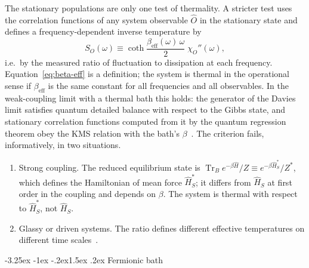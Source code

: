 \documentclass[10pt,a4paper]{article}
\makeatletter
\renewcommand{\subsection}{\@startsection{subsection}{2}{\z@}%
  {-3.25ex \@plus -1ex \@minus -.2ex}{1.5ex \@plus .2ex}%
  {\normalfont\fontsize{15.5pt}{19pt}\selectfont\bfseries}}
\newcommand{\Tr}{\operatorname{Tr}}
\makeatother
\begin{document}
The stationary populations are only one test of thermality.
A stricter test uses the correlation functions of any system observable $ \hat O $ in the stationary state and defines a frequency-dependent inverse temperature by
\begin{equation}
  S_O(\omega) \equiv \coth\frac{\beta_{\mathrm{eff}}(\omega)\,\omega}{2} \; \chi_O''(\omega) ,
  \label{eq:beta-eff}
\end{equation}
i.e.\ by the measured ratio of fluctuation to dissipation at each frequency.
Equation~\eqref{eq:beta-eff} is a definition; the system is thermal in the operational sense if $ \beta_{\mathrm{eff}} $ is the same constant for all frequencies and all observables.
In the weak-coupling limit with a thermal bath this holds: the generator of the Davies limit satisfies quantum detailed balance with respect to the Gibbs state, and stationary correlation functions computed from it by the quantum regression theorem obey the KMS relation with the bath's $ \beta $~\cite{Davies1974,Breuer2002}.
The criterion fails, informatively, in two situations.
\begin{enumerate}[label=(\roman*), leftmargin=2.2em]
\item Strong coupling. The reduced equilibrium state is $ \Tr_B e^{-\beta\hat H}/Z \equiv e^{-\beta \hat H_S^*}/Z^* $, which defines the Hamiltonian of mean force $ \hat H_S^* $; it differs from $ \hat H_S $ at first order in the coupling and depends on $ \beta $. The system is thermal with respect to $ \hat H_S^* $, not $ \hat H_S $.
\item Glassy or driven systems. The ratio defines different effective temperatures on different time scales~\cite{Cugliandolo2011}.
\end{enumerate}

\subsection{Fermionic bath}
\label{sec:fermionic}
\end{document}
